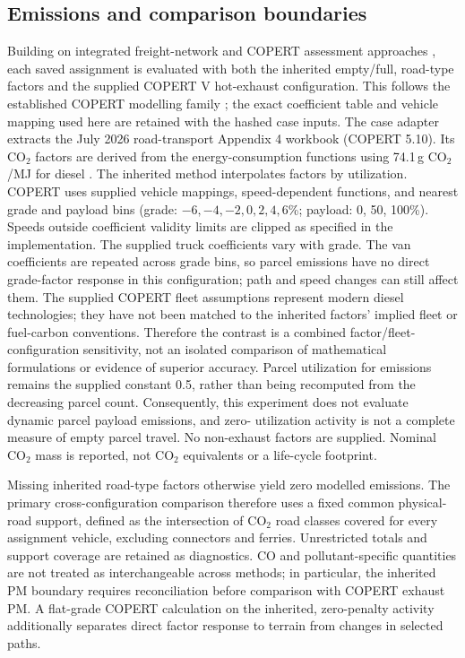\subsection{Emissions and comparison boundaries}
Building on integrated freight-network and COPERT assessment approaches
\parencite{dias2026}, each saved assignment is evaluated with both the inherited empty/full,
road-type factors and the supplied COPERT V hot-exhaust configuration. This follows the established
COPERT modelling family \parencite{eeaRoad2026}; the exact coefficient table and
vehicle mapping used here are retained with the hashed case inputs. The case
adapter extracts the July 2026 road-transport Appendix 4 workbook (COPERT 5.10).
Its CO$_2$ factors are derived from the energy-consumption functions using
74.1\,g CO$_2$/MJ for diesel \parencite{ipccMobile2006}.
The inherited method interpolates factors by utilization. COPERT uses supplied
vehicle mappings, speed-dependent functions, and nearest grade and payload
bins (grade: $-6,-4,-2,0,2,4,6$\%; payload: 0, 50, 100\%). Speeds outside
coefficient validity limits are clipped as specified in the implementation.
The supplied truck coefficients vary with grade. The van coefficients are
repeated across grade bins, so parcel emissions have no direct grade-factor
response in this configuration; path and speed changes can still affect them.
The supplied COPERT fleet assumptions represent modern diesel technologies;
they have not been matched to the inherited factors' implied fleet or
fuel-carbon conventions. Therefore
the contrast is a combined factor/fleet-configuration sensitivity, not an
isolated comparison of mathematical formulations or evidence of superior
accuracy. Parcel utilization for emissions remains the supplied constant 0.5, rather
than being recomputed from the decreasing parcel count. Consequently, this
experiment does not evaluate dynamic parcel payload emissions, and zero-
utilization activity is not a complete measure of empty parcel travel.
No non-exhaust factors are supplied. Nominal CO$_2$ mass is reported,
not CO$_2$ equivalents or a life-cycle footprint.

Missing inherited road-type factors otherwise yield zero modelled emissions.
The primary cross-configuration comparison therefore uses a fixed common
physical-road support, defined as the intersection of CO$_2$ road classes
covered for every assignment vehicle, excluding connectors and ferries.
Unrestricted totals and support coverage are retained as diagnostics.
CO and pollutant-specific quantities are not treated as interchangeable across
methods; in particular, the inherited PM boundary requires reconciliation
before comparison with COPERT exhaust PM. A flat-grade COPERT calculation on
the inherited, zero-penalty activity additionally separates direct factor
response to terrain from changes in selected paths.

